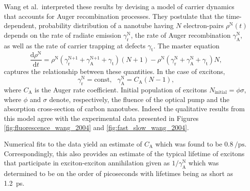 Wang et al.\ interpreted these results by devising a model of carrier dynamics that accounts for Auger recombination processes. They postulate that the time-dependent, probability distribution of a nanotube having $N$ electron-pairs $\rho^\text{N}(t)$ depends on the rate of radiate emission $\gamma^\text{N}_\text{r}$, the rate of Auger recombination $\gamma^\text{N}_\text{A}$, as well as the rate of carrier trapping at defects $\gamma_\text{t}$. The master equation
\begin{equation}
	\dfrac{\mathrm{d}\rho^\text{N}}{\mathrm{d} t} = \rho^\text{N}(\gamma^\text{N+1}_\text{r} + \gamma^\text{N+1}_\text{A} + \gamma_\text{t})(N+1) - \rho^\text{N}(\gamma^\text{N}_\text{r} + \gamma^\text{N}_\text{A} + \gamma_\text{t})N,
\end{equation}
captures the relationship between these quantities. In the case of excitons,
\begin{equation}
	\gamma^\text{N}_\text{r} = \text{const}, \text{   } \gamma^\text{N}_\text{A} = C_\text{A}(N-1),
\end{equation}
where $C_\text{A}$ is the Auger rate coefficient. Initial population of excitons $N_\text{initial} = \phi \sigma$, where $\phi$ and $\sigma$ denote, respectively, the fluence of the optical pump and the absorption cross-section of carbon nanotubes. Indeed the qualitative results from this model agree with the experimental data presented in Figures \ref{fig:fluorescence_wang_2004} and \ref{fig:fast_slow_wang_2004}.

Numerical fits to the data yield an estimate of $C_\text{A}$ which was found to be $\SI{0.8}{\per\pico\second}$. Correspondingly, this also provides an estimate of the typical lifetime of excitons that participate in exciton-exciton annihilation given as $1/\gamma^\text{N}_\text{A}$ which was determined to be on the order of picoseconds with lifetimes being as short as \SI{1.2}{\pico \second}.

